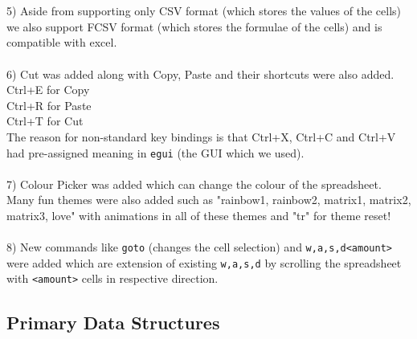 \documentclass{article}
\begin{document}
\\ \\
5) Aside from supporting only CSV format (which stores the values of the cells) we also support FCSV format (which stores the formulae of the cells) and is compatible with excel.
\\ \\
6) Cut was added along with Copy, Paste and their shortcuts were also added.\\
Ctrl+E for Copy\\
Ctrl+R for Paste\\
Ctrl+T for Cut\\
The reason for non-standard key bindings is that Ctrl+X, Ctrl+C and Ctrl+V had pre-assigned meaning in \texttt{egui} (the GUI which we used).
\\ \\
7) Colour Picker was added which can change the colour of the spreadsheet. Many fun themes were also added such as "rainbow1, rainbow2, matrix1, matrix2, matrix3, love" with animations in all of these themes and "tr" for theme reset!
\\ \\
8) New commands like \texttt{goto} (changes the cell selection) and \texttt{w,a,s,d<amount>} were added which are extension of existing \texttt{w,a,s,d} by scrolling the spreadsheet with \texttt{<amount>} cells in respective direction.

\subsection{Primary Data Structures}
\label{sec:data_structures}
\end{document}
